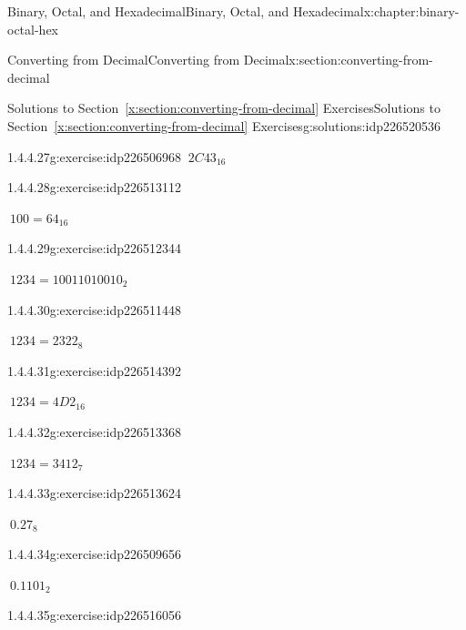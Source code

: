 \documentclass[twoside,10pt,]{book}
\newcommand{\xreffont}{\relax}
\numberwithin{equation}{section}
\begin{document}
\begin{chapterptx}{Binary, Octal, and Hexadecimal}{}{Binary, Octal, and Hexadecimal}{}{}{x:chapter:binary-octal-hex}
\begin{sectionptx}{Converting from Decimal}{}{Converting from Decimal}{}{}{x:section:converting-from-decimal}
\begin{solutions-subsection}{Solutions to Section~{\xreffont\ref*{x:section:converting-from-decimal}} Exercises}{}{Solutions to Section~{\xreffont\ref*{x:section:converting-from-decimal}} Exercises}{}{}{g:solutions:idp226520536}
\begin{exercisegroup}
\begin{divisionsolutioneg}{1.4.4.27}{}{g:exercise:idp226506968}
\noindent\hypertarget{g:solution:idp226507736-main}{}\(\ 2C43_{16}\)\end{divisionsolutioneg}%
\begin{divisionsolutioneg}{1.4.4.28}{}{g:exercise:idp226513112}%
\par\smallskip%
\noindent\hypertarget{g:solution:idp226513240-main}{}\(\ 100=64_{16}\)\end{divisionsolutioneg}%
\end{exercisegroup}
\par\medskip\noindent
\begin{exercisegroup}
\begin{divisionsolutioneg}{1.4.4.29}{}{g:exercise:idp226512344}%
\par\smallskip%
\noindent\hypertarget{g:solution:idp226508888-main}{}\(\ 1234=10011010010_2\)\end{divisionsolutioneg}%
\begin{divisionsolutioneg}{1.4.4.30}{}{g:exercise:idp226511448}%
\par\smallskip%
\noindent\hypertarget{g:solution:idp226513752-main}{}\(\ 1234=2322_8\)\end{divisionsolutioneg}%
\begin{divisionsolutioneg}{1.4.4.31}{}{g:exercise:idp226514392}%
\par\smallskip%
\noindent\hypertarget{g:solution:idp226510168-main}{}\(\ 1234=4D2_{16}\)\end{divisionsolutioneg}%
\begin{divisionsolutioneg}{1.4.4.32}{}{g:exercise:idp226513368}%
\par\smallskip%
\noindent\hypertarget{g:solution:idp226510296-main}{}\(\ 1234=3412_7\)\end{divisionsolutioneg}%
\end{exercisegroup}
\par\medskip\noindent
\begin{exercisegroup}
\begin{divisionsolutioneg}{1.4.4.33}{}{g:exercise:idp226513624}%
\par\smallskip%
\noindent\hypertarget{g:solution:idp226507992-main}{}\(\ 0.27_8\)\end{divisionsolutioneg}%
\begin{divisionsolutioneg}{1.4.4.34}{}{g:exercise:idp226509656}%
\par\smallskip%
\noindent\hypertarget{g:solution:idp226516824-main}{}\(\ 0.1101_2\)\end{divisionsolutioneg}%
\begin{divisionsolutioneg}{1.4.4.35}{}{g:exercise:idp226516056}%

\end{divisionsolutioneg}
\end{exercisegroup}
\end{solutions-subsection}
\end{sectionptx}
\end{chapterptx}
\end{document}
